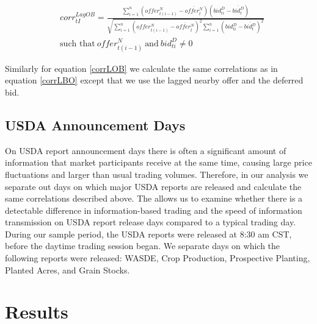 \documentclass[review,12pt]{elsarticle}
\begin{document}
\begin{linenumbers}
\begin{equation} \label{corrLOB}
\begin{split}
& corr^{LagOB}_{tI} = \frac{\sum\limits_{i=1}^{n} \left(offer_{t(i-1)}^N - \overline{offer_t^N}\right) \left(bid_{ti}^D - \overline{bid_t^D}\right)}{\sqrt{\sum\limits_{i=1}^{n} \left(offer_{t(i-1)}^N - \overline{offer_t^N}\right)^2 \sum\limits_{i=1}^{n}\left(bid_{ti}^D - \overline{bid_t^D}\right)^2}} \\
& \textrm{such that} \: {offer_{t(i-1)}^N \: \textrm{and} \: bid_{ti}^D} \neq 0
\end{split}
\end{equation}

Similarly for equation \ref{corrLOB} we calculate the same correlations
as in equation \ref{corrLBO} except that we use the lagged nearby offer
and the deferred bid.

\subsection{USDA Announcement Days}\label{usda-announcement-days}

On USDA report announcement days there is often a significant amount of
information that market participants receive at the same time, causing
large price fluctuations and larger than usual trading volumes.
Therefore, in our analysis we separate out days on which major USDA
reports are released and calculate the same correlations described
above. The allows us to examine whether there is a detectable difference
in information-based trading and the speed of information transmission
on USDA report release days compared to a typical trading day. During
our sample period, the USDA reports were released at 8:30 am CST, before
the daytime trading session began. We separate days on which the
following reports were released: WASDE, Crop Production, Prospective
Planting, Planted Acres, and Grain Stocks.

\section{Results}\label{results}


\end{linenumbers}
\end{document}
